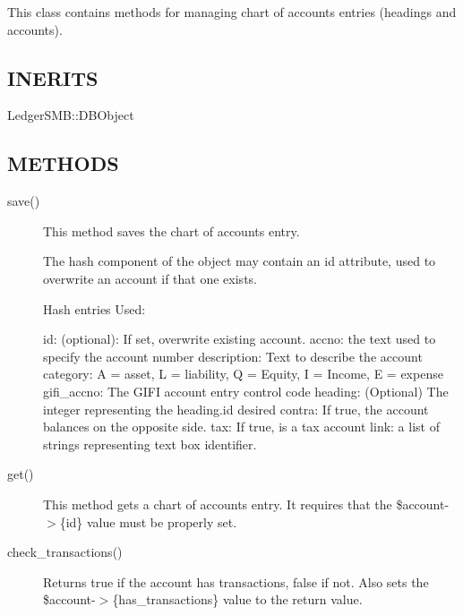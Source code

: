 \begin{description}
\begin{description}
\begin{description}
\begin{description}
\begin{description}
\begin{description}
\begin{description}
\begin{description}
\begin{description}
This class contains methods for managing chart of accounts entries (headings 
and accounts).

\subsection*{INERITS\label{LedgerSMB::DBObject::Account_INERITS}}
\begin{description}

\item[{LedgerSMB::DBObject}] \mbox{}\end{description}
\subsection*{METHODS\label{LedgerSMB::DBObject::Account_METHODS}}
\begin{description}

\item[{save()}] \mbox{}

This method saves the chart of accounts entry.



The hash component of the object may contain an id attribute, used to overwrite
an account if that one exists.



Hash entries Used:



id: (optional):  If set, overwrite existing account.
accno: the text used to specify the account number
description:  Text to describe the account
category: A = asset, L = liability, Q = Equity, I = Income, E = expense
gifi\_accno:  The GIFI account entry control code
heading: (Optional) The integer representing the heading.id desired 
contra:  If true, the account balances on the opposite side.
tax:  If true, is a tax account
link:  a list of strings representing text box identifier.


\item[{get()}] \mbox{}

This method gets a chart of accounts entry.  It requires that the \$account-$>$\{id\}
value must be properly set.


\item[{check\_transactions()}] \mbox{}

Returns true if the account has transactions, false if not.  Also sets the
\$account-$>$\{has\_transactions\} value to the return value.




\end{description}
\end{description}
\end{description}
\end{description}
\end{description}
\end{description}
\end{description}
\end{description}
\end{description}
\end{description}
